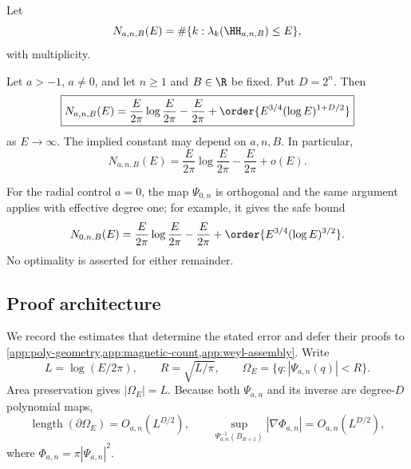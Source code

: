 Let
\begin{equation}
 N_{a,n,B}(E)=\#\{k:\lambda_k(\HH_{a,n,B})\leq E\},
 \label{eq:quantum-count-definition}
\end{equation}
with multiplicity.

\begin{theorem}
\label{thm:magnetic-weyl}
Let \(a>-1\), \(a\neq0\), and let \(n\geq1\) and \(B\in\R\) be fixed.  Put
\(D=2^n\).  Then
\begin{equation}
 \boxed{
 N_{a,n,B}(E)
 =\frac{E}{2\pi}\log\frac{E}{2\pi}
  -\frac{E}{2\pi}
  +\order{E^{3/4}(\log E)^{1+D/2}} }
 \label{eq:quantum-weyl}
\end{equation}
as \(E\to\infty\).  The implied constant may depend on \(a,n,B\).  In
particular,
\begin{equation}
 N_{a,n,B}(E)
 =\frac{E}{2\pi}\log\frac{E}{2\pi}
  -\frac{E}{2\pi}+o(E).
 \label{eq:two-growing-terms}
\end{equation}
\end{theorem}

For the radial control \(a=0\), the map \(\Psi_{0,n}\) is orthogonal and the
same argument applies with effective degree one; for example, it gives the
safe bound
\begin{equation}
 N_{0,n,B}(E)
 =\frac{E}{2\pi}\log\frac{E}{2\pi}
  -\frac{E}{2\pi}
  +\order{E^{3/4}(\log E)^{3/2}}.
 \label{eq:radial-magnetic-weyl}
\end{equation}
No optimality is asserted for either remainder.

\subsection{Proof architecture}

We record the estimates that determine the stated error and defer their
proofs to \cref{app:poly-geometry,app:magnetic-count,app:weyl-assembly}.
Write
\begin{equation}
 L=\log(E/2\pi),\qquad R=\sqrt{L/\pi},\qquad
 \Omega_E=\{q:|\Psi_{a,n}(q)|<R\}.
 \label{eq:allowed-domain}
\end{equation}
Area preservation gives \(|\Omega_E|=L\).  Because both
\(\Psi_{a,n}\) and its inverse are degree-\(D\) polynomial maps,
\begin{equation}
 \operatorname{length}(\partial\Omega_E)
 =O_{a,n}(L^{D/2}),
 \qquad
 \sup_{\Psi_{a,n}^{-1}(B_{R+1})}|\nabla\Phi_{a,n}|
 =O_{a,n}(L^{D/2}),
 \label{eq:allowed-geometry}
\end{equation}
where \(\Phi_{a,n}=\pi|\Psi_{a,n}|^2\).

